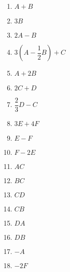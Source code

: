 \documentclass[12pt]{exam}
\begin{document}
    \begin{multicols}{3}
        \begin{enumerate}[label={\alph*})]
            \item $A + B$
            \item $3B$
            \item $2A - B$
            \item $3(A - \dfrac{1}{2}B) + C$
            \item $A + 2B$
            \item $2C + D$
            \item $\dfrac{2}{3}D - C$
            \item $3E + 4F$
            \item $E - F$
            \item $F - 2E$
            \item $AC$
            \item $BC$
            \item $CD$
            \item $CB$
            \item $DA$
            \item $DB$
            \item $-A$
            \item $-2F$
        \end{enumerate}
    \end{multicols}
    
    \vspace{.3cm}
\end{document}
